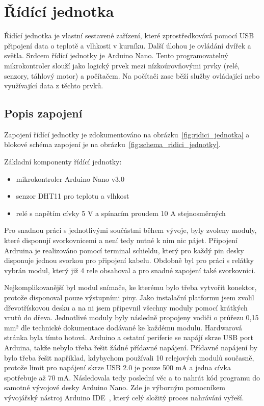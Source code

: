 \section{Řídící jednotka}\label{sec:ridici-jednotka}
Řídící jednotka je vlastní sestavené zařízení, které zprostředkovává pomocí USB připojení data o teplotě a vlhkosti v kurníku.
Další úlohou je ovládání dvířek a světla.
Srdcem řídící jednotky je Arduino Nano.
Tento programovatelný mikrokontroler slouží jako logický prvek mezi nízkoúrovňovými prvky (relé, senzory, táhlový motor) a počítačem.
Na počítači zase běží služby ovládající nebo využívající data z těchto prvků.

\subsection*{Popis zapojení}
Zapojení řídící jednotky je zdokumentováno na obrázku~\ref{fig:ridici_jednotka} a blokové schéma zapojení je na obrázku~\ref{fig:schema_ridici_jednotky}.

Základní komponenty řídící jednotky:
\begin{itemize}
    \item mikrokontroler Arduino Nano v3.0
    \item senzor DHT11 pro teplotu a vlhkost
    \item relé s napětím cívky 5 V a spínacím proudem 10 A stejnosměrných
\end{itemize}
Pro snadnou práci s jednotlivými součástmi během vývoje, byly zvoleny moduly, které disponují svorkovnicemi a není tedy nutné k nim nic pájet.
Připojení Ardruina je realizováno pomocí terminal schieldu, který pro každý pin desky disponuje jednou svorkou pro připojení kabelu.
Obdobně byl pro práci s relátky vybrán modul, který již 4 rele obsahoval a pro snadné zapojení také svorkovnici.

Nejkomplikovanější byl modul snímače, ke kterému bylo třeba vytvořit konektor, protože disponoval pouze výstupními piny.
Jako instalační platformu jsem zvolil dřevotřískovou desku a na ni jsem připevnil všechny moduly pomocí krátkých vrutů do dřeva.
Jednotlivé moduly byly následně propojeny vodiči o průřezu 0,15 mm² dle technické dokumentace dodávané ke každému modulu.
Hardwarová stránka byla tímto hotová.
\newline
Arduino a ostatní periferie se napájí skrze USB port Arduina, takže nebylo třeba řešit žádné přídavné napájení.
Přídavné napájení by bylo třeba řešit například, kdybychom používali 10 relejových modulů současně, protože limit pro napájení skrze USB 2.0 je pouze 500 mA a jedna cívka spotřebuje až 70 mA.\newline
Následovala tedy poslední věc a to nahrát kód programu do samotné vývojové desky Arduino Nano.
Zde je výborným pomocníkem vývojářský nástroj Arduino IDE~\cite{arduino-ide}, který celý složitý proces nahrávání vyřeší.


